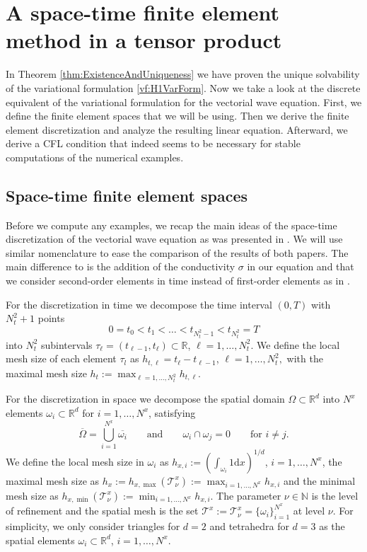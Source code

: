 \documentclass[a4paper,11pt]{article}
\newcommand{\N}{\mathbb N}
\newcommand{\R}{\mathbb R}
\begin{document}
\section{A space-time finite element method in a tensor product}
In Theorem \ref{thm:ExistenceAndUniqueness} we have proven the unique solvability of the variational formulation \eqref{vf:H1VarForm}. Now we take a look at the discrete equivalent of the variational formulation for the vectorial wave equation. First, we define the finite element spaces that we will be using. Then we derive the finite element discretization and analyze the resulting linear equation. Afterward, we derive a CFL condition  that indeed seems to be necessary for stable computations of the numerical examples.
\subsection{Space-time finite element spaces}\label{sec:FES}
Before we compute any examples, we recap the main ideas of the space-time discretization of the vectorial wave equation as was presented in \cite{HauserZank2023}. We will use similar nomenclature to ease the comparison of the results of both papers. The main difference to \cite{HauserZank2023} is the addition of the conductivity $\sigma$ in our equation and that we consider second-order elements in time instead of first-order elements as in \cite{HauserZank2023}.

For the discretization in time we decompose the time interval $(0,T)$ with $N_t^2+1$ points
\begin{equation*}
	0 = t_0 < t_1 < \dots < t_{N_t^2-1} < t_{N_t^2} = T
\end{equation*}
into $N_t^2$ subintervals  $\tau_\ell = (t_{\ell-1}, t_\ell) \subset \R$, $\ell=1,\dots, N_t^2.$ We define the local mesh size of each element $\tau_l$ as $h_{t,\ell} = t_\ell - t_{\ell-1}$, $\ell=1,\dots, N_t^2,$ with the maximal mesh size $h_t := \max_{\ell=1,\dots, N_t^2} h_{t,\ell}.$ 

For the discretization in space we decompose the spatial domain $\Omega \subset \R^d$ into $N^x$ elements $\omega_i \subset \R^d$ for $i=1,\dots, N^x$, satisfying
\begin{equation*}
	\overline{\Omega} = \bigcup_{i=1}^{N^x} \overline{\omega_{i}}\qquad\text{and}\qquad \omega_{i}\cap \omega_{j} = 0 \qquad\text{for } i\neq j.
\end{equation*}
 We define  the local mesh size in $\omega_i$ as  $h_{x,i} := \left( \int_{\omega_i} 1 \mathrm dx \right)^{1/d}$, $i=1,\dots, N^x$, the maximal mesh size as $h_x := h_{x,\max}(\mathcal T^x_\nu) := \max_{i=1,\dots, N^x} h_{x,i}$ and the minimal mesh size as $h_{x,\min}(\mathcal T^x_\nu) := \min_{i=1,\dots, N^x} h_{x,i}$. The parameter $\nu \in \N$ is the level of refinement and the spatial mesh is the set $\mathcal T^x := \mathcal T^x_{\nu} = \{ \omega_i \}_{i=1}^{N^x}$ at level $\nu$. For simplicity, we only consider triangles for $d=2$ and tetrahedra for $d=3$ as the spatial elements $\omega_i \subset \R^d$, $i=1,\dots, N^x$.
\end{document}
